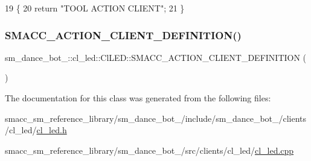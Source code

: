 \begin{DoxyCode}
19 \{
20     \textcolor{keywordflow}{return} \textcolor{stringliteral}{"TOOL ACTION CLIENT"};
21 \}
\end{DoxyCode}
\mbox{\label{classsm__dance__bot__2_1_1cl__led_1_1ClLED_aa90e141f886853f8277b8db254fa981c}} 
\subsubsection{\texorpdfstring{S\+M\+A\+C\+C\+\_\+\+A\+C\+T\+I\+O\+N\+\_\+\+C\+L\+I\+E\+N\+T\+\_\+\+D\+E\+F\+I\+N\+I\+T\+I\+O\+N()}{SMACC\_ACTION\_CLIENT\_DEFINITION()}}
{\footnotesize\ttfamily sm\+\_\+dance\+\_\+bot\+\_\+::cl\+\_\+led\+::\+Cl\+L\+E\+D\+::\+S\+M\+A\+C\+C\+\_\+\+A\+C\+T\+I\+O\+N\+\_\+\+C\+L\+I\+E\+N\+T\+\_\+\+D\+E\+F\+I\+N\+I\+T\+I\+ON (\begin{DoxyParamCaption}\item[{sm\+\_\+dance\+\_\+bot\+\_\+2\+::\+L\+E\+D\+Control\+Action}]{ }\end{DoxyParamCaption})}



The documentation for this class was generated from the following files\+:\begin{DoxyCompactItemize}
\item 
smacc\+\_\+sm\+\_\+reference\+\_\+library/sm\+\_\+dance\+\_\+bot\+\_/include/sm\+\_\+dance\+\_\+bot\+\_/clients/cl\+\_\+led/\hyperlink{sm__dance__bot__2_2include_2sm__dance__bot__2_2clients_2cl__led_2cl__led_8h}{cl\+\_\+led.\+h}\item 
smacc\+\_\+sm\+\_\+reference\+\_\+library/sm\+\_\+dance\+\_\+bot\+\_/src/clients/cl\+\_\+led/\hyperlink{sm__dance__bot__2_2src_2clients_2cl__led_2cl__led_8cpp}{cl\+\_\+led.\+cpp}\end{DoxyCompactItemize}
